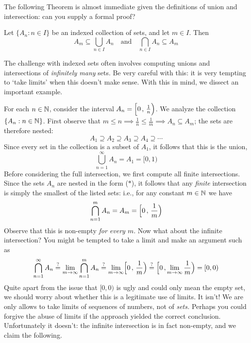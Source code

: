 The following Theorem is almost immediate given the definitions of union and intersection: can you supply a formal proof?

\begin{thm}{}{}
	Let $\{A_n:n\in I\}$ be an indexed collection of sets, and let $m\in I$. Then
	\[
		A_m\subseteq\bigcup_{n\in I}A_n\quad\text{and}\quad \bigcap_{n\in I}A_n\subseteq A_m
	\]
\end{thm}






The challenge with indexed sets often involves computing unions and intersections of \emph{infinitely many} sets. Be very careful with this: it is very tempting to `take limits' when this doesn't make sense. With this in mind, we dissect an important example.\par

For each $n\in\mathbb{N}$, consider the interval $A_n=\Bigl[0\,,\,\frac 1n\Bigr)$. We analyze the collection $\{A_n:n\in\mathbb{N}\}$. First observe that $m\le n\implies \frac 1n\le \frac 1m\implies A_n\subseteq A_m$; the sets are therefore nested:
\[
	A_1\supseteq A_2\supseteq A_3\supseteq A_4\supseteq\cdots\tag{$\ast$}
\]
Since every set in the collection is a subset of $A_1$, it follows that this is the union,
\[
	\bigcup_{n=1}^\infty A_n=A_1=[0,1)
\]
Before considering the full intersection, we first compute all finite intersections. Since the sets $A_n$ are nested in the form ($\ast$), it follows that any \emph{finite} intersection is simply the smallest of the listed sets: i.e., for any constant $m\in\mathbb{N}$ we have
\[
	\bigcap_{n=1}^mA_n=A_m=\Bigl[0\,,\,\frac 1m\Bigr)
\]
Observe that this is non-empty \emph{for every $m$}. Now what about the infinite intersection? You might be tempted to take a limit and make an argument such as
\[
	\bigcap\limits_{n=1}^\infty A_n\overset{?}{=}\lim_{m\to\infty}\bigcap_{n=1}^mA_n\overset{?}{=}\lim_{m\to\infty}\Bigl[0\,,\,\frac 1m\Bigr)\overset{?}{=}\Bigl[0\,,\lim_{m\to\infty}\frac 1m\Bigr)=[0,0)
\]
Quite apart from the issue that $[0,0)$ is ugly and could only mean the empty set, we should worry about whether this is a legitimate use of limits. It isn't! We are only allows to take limits of sequences of numbers, not of \emph{sets.} Perhaps you could forgive the abuse of limits if the approach yielded the correct conclusion. Unfortunately it doesn't: the infinite intersection is in fact non-empty, and we claim the following.

